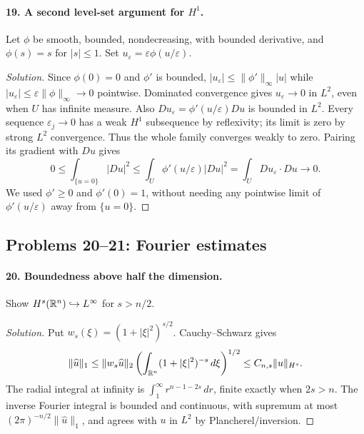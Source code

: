 \paragraph{19. A second level-set argument for $H^1$.}
Let $\phi$ be smooth, bounded, nondecreasing, with bounded derivative,
and $\phi(s)=s$ for $|s|\leq1$. Set
$u_\varepsilon=\varepsilon\phi(u/\varepsilon)$.
\begin{proof}[Solution]
Since $\phi(0)=0$ and $\phi'$ is bounded,
$|u_\varepsilon|\leq\|\phi'\|_\infty|u|$ while
$|u_\varepsilon|\leq\varepsilon\|\phi\|_\infty\to0$ pointwise.
Dominated convergence gives $u_\varepsilon\to0$ in $L^2$, even when
$U$ has infinite measure. Also
$Du_\varepsilon=\phi'(u/\varepsilon)Du$ is bounded in $L^2$.
Every sequence $\varepsilon_j\to0$ has a weak $H^1$ subsequence by
reflexivity; its limit is zero by strong $L^2$ convergence.
Thus the whole family converges weakly to zero.
Pairing its gradient with $Du$ gives
\[
 0\leq\int_{\{u=0\}}|Du|^2
 \leq\int_U\phi'(u/\varepsilon)|Du|^2
 =\int_U Du_\varepsilon\cdot Du\to0.
\]
We used $\phi'\geq0$ and $\phi'(0)=1$, without needing any pointwise
limit of $\phi'(u/\varepsilon)$ away from $\{u=0\}$.
\end{proof}

\subsection{Problems 20--21: Fourier estimates}
\paragraph{20. Boundedness above half the dimension.}
Show $H^s(\mathbb{R}^n)\hookrightarrow L^\infty$ for $s>n/2$.
\begin{proof}[Solution]
Put $w_s(\xi)=(1+|\xi|^2)^{s/2}$. Cauchy--Schwarz gives
\[
 \|\widehat u\|_1
 \leq\|w_s\widehat u\|_2
 \left(\int_{\mathbb{R}^n}(1+|\xi|^2)^{-s}\,d\xi\right)^{1/2}
 \leq C_{n,s}\|u\|_{H^s}.
\]
The radial integral at infinity is
$\int_1^\infty r^{n-1-2s}\,dr$, finite exactly when $2s>n$.
The inverse Fourier integral is bounded and continuous, with supremum
at most $(2\pi)^{-n/2}\|\widehat u\|_1$, and agrees with $u$ in $L^2$
by Plancherel/inversion.
\end{proof}
\Needspace{45mm}


